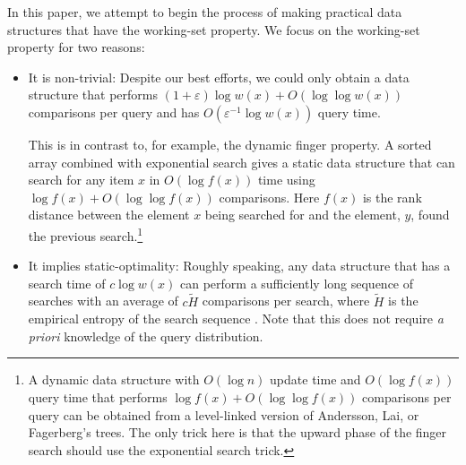 \documentclass[lotsofwhite]{patmorin}
\begin{document}
In this paper, we attempt to begin the process of making practical data
structures that have the working-set property.  We focus on the
working-set property for two reasons:

\begin{itemize}
\item It is non-trivial: Despite our best efforts, we could only obtain
    a data structure that performs $(1+\varepsilon)\log w(x) + O(\log\log
    w(x))$ comparisons per query and has $O(\varepsilon^{-1}\log w(x))$
    query time.

    This is in contrast to, for example, the dynamic finger property.
    A sorted array combined with exponential search gives a static data
    structure that can search for any item $x$ in $O(\log f(x))$ time
    using $\log f(x) + O(\log\log f(x))$ comparisons.  Here $f(x)$ is the rank distance between the element $x$ being searched for and the element, $y$, found the previous search.\footnote{A dynamic
    data structure with
    $O(\log n)$ update time and $O(\log f(x))$ query time
    that performs $\log f(x) + O(\log\log f(x))$ comparisons per query
    can be obtained from a level-linked version of Andersson, Lai, or
    Fagerberg's trees. The only trick here is that the upward
    phase of the finger search should use the exponential search trick.}

\item It implies static-optimality: Roughly speaking, any data structure
    that has a search time of $c\log w(x)$ can perform a sufficiently long
    sequence of searches with an average of $c\tilde{H}$ comparisons per
    search, where $\tilde{H}$ is the empirical entropy of the search
    sequence \cite{X,Y}.  Note that this does not require \emph{a
    priori} knowledge of the query distribution.  
\end{itemize}
\end{document}

